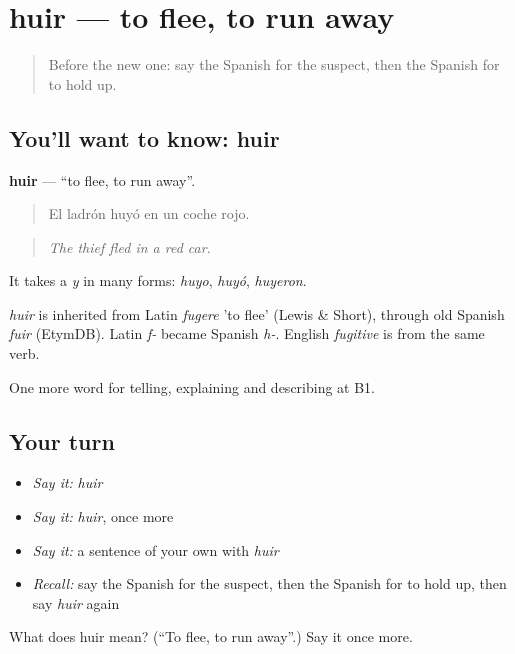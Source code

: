 \section[huir]{huir — to flee, to run away}

\label{lesson:ES-C518-huir}



\begin{quote}
Before the new one: say the Spanish for the suspect, then the Spanish for to hold up.
\end{quote}

\subsection*{You'll want to know: huir}
\textbf{huir} — \textquotedblleft{}to flee, to run away\textquotedblright{}.

\begin{quote}
El ladrón huyó en un coche rojo.
\end{quote}

\begin{quote}
\emph{The thief fled in a red car.}
\end{quote}

It takes a \emph{y} in many forms: \emph{huyo}, \emph{huyó}, \emph{huyeron}.

\begin{cousinweb}
\emph{huir} is inherited from Latin \emph{fugere} 'to flee' (Lewis \& Short), through old Spanish \emph{fuir} (EtymDB). Latin \emph{f-} became Spanish \emph{h-}. English \emph{fugitive} is from the same verb.
\end{cousinweb}

\begin{grammarlens}[title={What you've built}]
One more word for telling, explaining and describing at B1.
\end{grammarlens}

\subsection*{Your turn}
\begin{itemize}
\raggedright
  \item \emph{Say it:} \emph{huir}
  \item \emph{Say it:} \emph{huir}, once more
  \item \emph{Say it:} a sentence of your own with \emph{huir}
  \item \emph{Recall:} say the Spanish for the suspect, then the Spanish for to hold up, then say \emph{huir} again
\end{itemize}

\begin{tcolorbox}[breakable,colback=teal!4,colframe=teal!35!black,title={Before you move on}]
What does huir mean? (\textquotedblleft{}To flee, to run away\textquotedblright{}.) Say it once more.
\end{tcolorbox}
